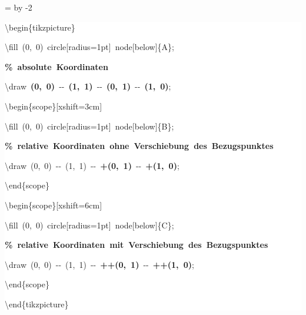\begingroup
\ttfamily
{}
=\textwidth
\advance{} by -2\fboxsep
\noindent
\colorbox{background}
{%
\parbox{\dimen255}
{%
\rule[-0.5ex]{0pt}{2.5ex}\hspace*{0.0em}\textbackslash{}begin\{tikzpicture\}\\
\rule[-0.5ex]{0pt}{2.5ex}\hspace*{1.0em}\textbackslash{}fill~(0,~0)~circle[radius=1pt]~node[below]\{A\};\\
\rule[-0.5ex]{0pt}{2.5ex}\hspace*{1.0em}\textcolor{G}{\textbf{\%~absolute~Koordinaten}}\\
\rule[-0.5ex]{0pt}{2.5ex}\hspace*{1.0em}\textbackslash{}draw~\textcolor{R}{\textbf{(0,~0)}}~{-}{-}~\textcolor{R}{\textbf{(1,~1)}}~{-}{-}~\textcolor{R}{\textbf{(0,~1)}}~{-}{-}~\textcolor{R}{\textbf{(1,~0)}};\\
\rule[-0.5ex]{0pt}{2.5ex}\hspace*{1.0em}\textbackslash{}begin\{scope\}[xshift=3cm]\\
\rule[-0.5ex]{0pt}{2.5ex}\hspace*{2.0em}\textbackslash{}fill~(0,~0)~circle[radius=1pt]~node[below]\{B\};\\
\rule[-0.5ex]{0pt}{2.5ex}\hspace*{2.0em}\textcolor{G}{\textbf{\%~relative~Koordinaten~ohne~Verschiebung~des~Bezugspunktes}}\\
\rule[-0.5ex]{0pt}{2.5ex}\hspace*{2.0em}\textbackslash{}draw~(0,~0)~{-}{-}~(1,~1)~{-}{-}~\textcolor{R}{\textbf{+(0,~1)}}~{-}{-}~\textcolor{R}{\textbf{+(1,~0)}};\\
\rule[-0.5ex]{0pt}{2.5ex}\hspace*{1.0em}\textbackslash{}end\{scope\}\\
\rule[-0.5ex]{0pt}{2.5ex}\hspace*{1.0em}\textbackslash{}begin\{scope\}[xshift=6cm]\\
\rule[-0.5ex]{0pt}{2.5ex}\hspace*{2.0em}\textbackslash{}fill~(0,~0)~circle[radius=1pt]~node[below]\{C\};\\
\rule[-0.5ex]{0pt}{2.5ex}\hspace*{2.0em}\textcolor{G}{\textbf{\%~relative~Koordinaten~mit~Verschiebung~des~Bezugspunktes}}\\
\rule[-0.5ex]{0pt}{2.5ex}\hspace*{2.0em}\textbackslash{}draw~(0,~0)~{-}{-}~(1,~1)~{-}{-}~\textcolor{R}{\textbf{++(0,~1)}}~{-}{-}~\textcolor{R}{\textbf{++(1,~0)}};\\
\rule[-0.5ex]{0pt}{2.5ex}\hspace*{1.0em}\textbackslash{}end\{scope\}\\
\rule[-0.5ex]{0pt}{2.5ex}\hspace*{0.0em}\textbackslash{}end\{tikzpicture\}}%
}%
\endgroup
